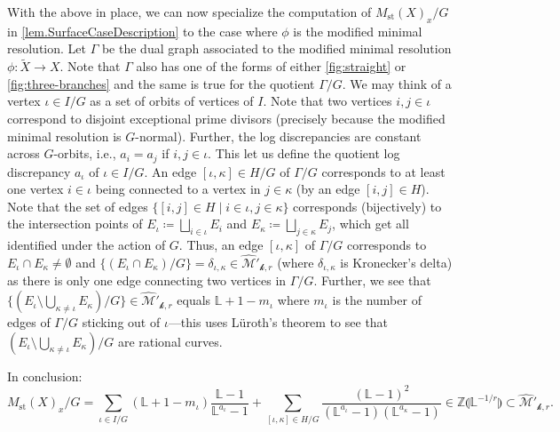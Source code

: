 \documentclass[12pt]{amsart}
\theoremstyle{plain}   %
\theoremstyle{definition}    %
\theoremstyle{remark}    %
\numberwithin{equation}{theorem}
\DeclareMathOperator{\st}{\mathrm{st}}
\newcommand{\kay}{\mathcal{k}}
\newcommand{\sM}{\mathcal{M}}
\newcommand{\bL}{\mathbb{L}}
\newcommand{\bZ}{\mathbb{Z}}
\begin{document}
With the above in place, we can now specialize the computation of $M_{\st}(X)_x/G$ in \autoref{lem.SurfaceCaseDescription} to the case where $\phi$ is the modified minimal resolution. Let $\Gamma$ be the dual graph associated to the modified minimal resolution $\phi\colon\tilde{X}\to X$. Note that $\Gamma$ also has one of the forms of either \autoref{fig:straight} or \autoref{fig:three-branches} and the same is true for the quotient $\Gamma/G$.  We may think of a vertex $\iota \in I/G$ as a set of orbits of vertices of $I$. Note that two vertices $i, j \in \iota$ correspond to disjoint exceptional prime divisors (precisely because the modified minimal resolution is $G$-normal). Further, the log discrepancies are constant across $G$-orbits, i.e., $a_i=a_j$ if $i,j \in \iota$. This let us define the quotient log discrepancy $a_{\iota}$ of $\iota \in I/G$. An edge $[\iota,\kappa] \in H/G$ of $\Gamma/G$ corresponds to at least one vertex $i \in \iota$ being connected to a vertex in $j \in \kappa$ (by an edge $[i,j] \in H$). Note that the set of edges $\{[i,j] \in H \mid i\in \iota, j\in \kappa\}$ corresponds (bijectively) to the intersection points of $E_{\iota} \coloneqq \bigsqcup_{i \in \iota} E_i$ and $E_{\kappa} \coloneqq \bigsqcup_{j \in \kappa} E_j$, which get all identified under the action of $G$. Thus, an edge $[\iota,\kappa]$ of $\Gamma/G$ corresponds to $E_{\iota} \cap E_{\kappa} \neq \emptyset$ and $\{(E_{\iota} \cap E_{\kappa})/G\} = \delta_{\iota, \kappa} \in \hat{\sM}'_{\kay,r}$ (where $\delta_{\iota,\kappa}$ is Kronecker's delta) as there is only one edge connecting two vertices in $\Gamma/G$. Further, we see that $\{(E_{\iota} \setminus \bigcup_{\kappa \neq \iota} E_{\kappa})/G\}\in \hat{\sM}'_{\kay,r}$ equals $\bL+1 - m_{\iota}$ where $m_{\iota}$ is the number of edges of $\Gamma/G$ sticking out of $\iota$---this uses L\"uroth's theorem to see that $(E_{\iota} \setminus \bigcup_{\kappa \neq \iota} E_{\kappa})/G$ are rational curves.

In conclusion:
\begin{equation} \label{eqn.DescriptionOfStringyInvariantsForCurves}
M_{\st}(X)_x/G = \sum_{\iota\in I/G} (\bL +1 - m_{\iota}) \frac{\bL-1}{\bL^{a_{\iota}}-1}+\sum_{[\iota,\kappa]\in H/G}\frac{(\bL-1)^{2}}{(\bL^{a_{\iota}}-1)(\bL^{a_{\kappa}}-1)} \in \bZ\llparenthesis\bL^{-1/r} \rrparenthesis \subset \hat{\sM}'_{\kay,r}.
\end{equation}
\end{document}
